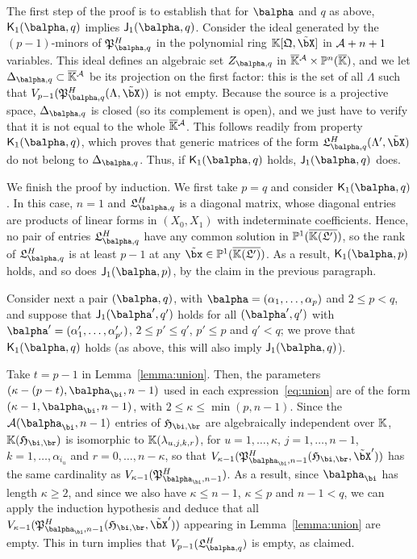 \documentclass[12pt]{article}
\begin{document}
The first step of the proof is to establish that for $\balpha$ and $q$
as above, $\assJ_1(\balpha,q)$ implies $\assI_1(\balpha,q)$. Consider
the ideal generated by the $(p-1)$-minors of
$\mathfrak{P}^H_{\balpha,q}$ in the polynomial ring
$\KK[\mathfrak{Q},\tilde\bX]$ in ${\cal A}+n+1$ variables. This ideal
defines an algebraic set $Z_{\balpha,q}$ in $\overline{\mathbb{K}}{}^{\cal A} \times
\mathbb{P}^n(\overline{\mathbb{K}})$, and we let $\Delta_{\balpha,q} \subset \KKbar{}^{\cal
  A}$ be its projection on the first factor: this is the set of all
$\Lambda$ such that
$V_{p-1}(\mathfrak{P}^H_{\balpha,q}(\Lambda,\tilde\bX))$ is not
empty. Because the source is a projective space, $\Delta_{\balpha,q}$
is closed (so its complement is open), and we just have to verify that
it is not equal to the whole $\overline{\mathbb{K}}{}^{\cal A}$. This follows readily
from property $\assJ_1(\balpha,q)$, which proves that generic matrices
of the form $\mathfrak{L}^H_{\balpha,q}(\Lambda',\tilde\bX)$ do not
belong to $\Delta_{\balpha,q}$. Thus, if $\assJ_1(\balpha,q)$ holds, 
$\assI_1(\balpha,q)$ does.

We finish the proof by induction. We first take $p=q$ and consider
$\assJ_1(\balpha,q)$.  In this case, $n=1$ and
$\mathfrak{L}^H_{\balpha,q}$ is a diagonal matrix, whose diagonal
entries are products of linear forms in $(X_0,X_1)$ with indeterminate
coefficients. Hence, no pair of entries $\mathfrak{L}^H_{\balpha,q}$
have any common solution in $\mathbb{P}^1(\overline{\mathbb{K}(\mathfrak{L}')})$, so the rank of
$\mathfrak{L}^H_{\balpha,q}$ is at least $p-1$ at any $\tilde\bx \in
\P^1(\KKGpbar)$. As a result, $\assJ_1(\balpha,p)$ holds, and so does
$\assI_1(\balpha,p)$, by the claim in the previous paragraph.

Consider next a pair $(\balpha,q)$, with
$\balpha=(\alpha_1,\dots,\alpha_p)$ and $2 \le p < q$, and suppose
that $\assI_1(\balpha',q')$ holds for all $(\balpha',q')$ with
$\balpha'=(\alpha'_1,\dots,\alpha'_{p'})$, $2 \le p' \le q'$, $p' \le p$ and $q'
< q$; we prove that $\assJ_1(\balpha,q)$ holds (as above, this will
also imply $\assI_1(\balpha,q)$).

Take $t=p-1$ in Lemma~\ref{lemma:union}. Then, the parameters
$(\kappa-(p-t),\balpha_\bi,n-1)$ used in each
expression~\eqref{eq:union} are of the form
$(\kappa-1,\balpha_\bi,n-1)$, with $2 \le \kappa \le \min(p,n-1)$.
Since the ${\cal A}(\balpha_\bi,n-1)$ entries of $\mathfrak{H}_{\bi,\br}$ are algebraically
independent over $\mathbb{K}$, $\KK(\mathfrak{H}_{\bi,\br})$ is isomorphic to 
$\mathbb{K}(\lambda_{u,j,k,r})$, for $u=1,\dots,\kappa$, 
$j=1,\dots,n-1$, $k=1,\dots,\alpha_{i_u}$ 
and $r=0,\dots,n-\kappa$, so that $V_{\kappa-1}(\mathfrak{P}^H_{\balpha_\bi,n-1}(\mathfrak{H}_{\bi,\br},\tilde\bX'))$
has the same cardinality as 
$V_{\kappa-1}(\mathfrak{P}^H_{\balpha_\bi,n-1})$.
As a result, since $\balpha_\bi$ has length $\kappa\ge 2$, and since we also
have $\kappa \le n-1$, $\kappa \le p$ and $n-1 < q$, we can apply the
induction hypothesis and deduce that all
$V_{\kappa-1}(\mathfrak{P}^H_{\balpha_\bi,n-1}(\mathfrak{H}_{\bi,\br},\tilde\bX'))$ appearing
in Lemma~\ref{lemma:union} are empty. This in turn implies that
$V_{p-1}(\mathfrak{L}^H_{\balpha,q})$ is empty, as claimed.
\end{document}
